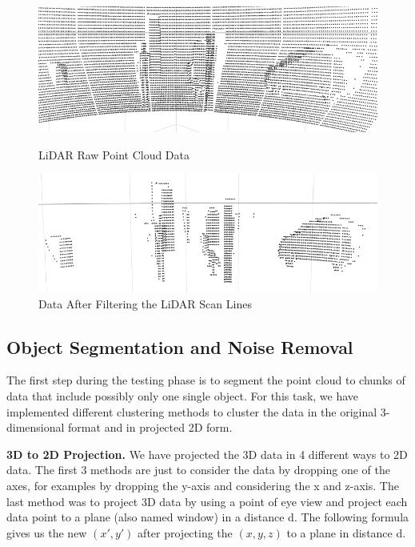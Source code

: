 \begin{figure}[!h]
\centering
\begin{minipage}{0.49\textwidth}
  \centering
        \includegraphics[width=.9\linewidth]{images/ground_before2.png}
        \caption{LiDAR Raw Point Cloud Data}
        \label{fig:ground_before}
\end{minipage}%
\begin{minipage}{0.49\textwidth}
  \centering
        \includegraphics[width=.9\linewidth]{images/ground_after2.png}
        \caption{Data After Filtering the LiDAR Scan Lines}
        \label{fig:after}
\end{minipage}%
\end{figure}





\subsection{Object Segmentation and Noise Removal}
The first step during the testing phase is to segment the point cloud to chunks of data that include possibly only one single object.
For this task, we have implemented different clustering methods to cluster the data in the original 3-dimensional format and in projected 2D form.



\textbf{3D to 2D Projection.} We have projected the 3D data in 4 different ways to 2D data. 
The first 3 methods are just to consider the data by dropping one of the axes, for examples by dropping the y-axis and considering the x and z-axis. 
The last method was to project 3D data by using a point of eye view and project each data point to a plane (also named window) in a distance d.
The following formula gives us the new $(x',  y')$ after projecting the $(x,y,z)$ to a plane in distance d.

